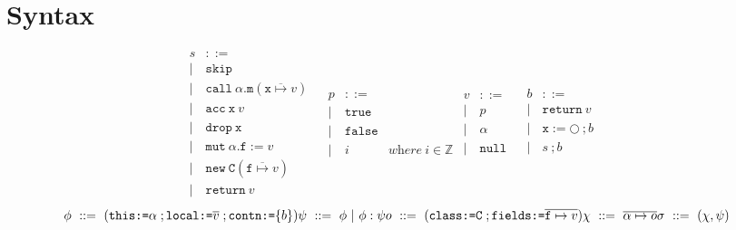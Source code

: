 \documentclass[12pt]{article}
\date{}
\begin{document}
	\maketitle
	
	\section{Syntax}
	\begin{figure}[h]
	$$
	\begin{array}{llr}
	s & ::= &\\ 
	| & \texttt{skip} &\\
	| & \texttt{call}\ \alpha.\texttt{m}(\overline{\texttt{x} \mapsto v}) &\\ 
	| & \texttt{acc}\ \texttt{x}\ v &\\
	| & \texttt{drop}\ \texttt{x} &\\
	| & \texttt{mut}\ \alpha.\texttt{f} := v &\\
	| & \texttt{new}	\ \texttt{C}(\overline{\texttt{f} \mapsto v}) &\\
	| & \texttt{return}\ v
	\end{array}
	\begin{array}{llr}
	p & ::= &\\ 
	| & \texttt{true} &\\
	| & \texttt{false} &\\
	| & i & \textit{where}\ i \in \mathbb{Z}
	\end{array}
	\begin{array}{llr}
	v & ::= &\\ 
	| & p &\\
	| & \alpha\\
	| & \texttt{null}
	\end{array}
	\begin{array}{llr}
	b & ::= &\\ 
	| & \texttt{return}\ v &\\
	| & \texttt{x} := \bigcirc\ ; b&\\
	| & s\ ; b\\
	\end{array}
	$$
	\[
	\phi\ ::=\ (\texttt{this:=}\alpha\; ;\texttt{local:=}\overline{v}\; ; \texttt{contn:=}\{b\})\\
	\psi\ ::=\ \phi\ |\ \phi : \psi\\
	o\ ::=\ (\texttt{class:=C}\; ; \texttt{fields:=}\overline{\texttt{f}\mapsto v})\\
	\chi\ ::=\ \overline{\alpha \mapsto o}\\
	\sigma\ ::=\ (\chi, \psi)\\
\]
\end{figure}
\end{document}
